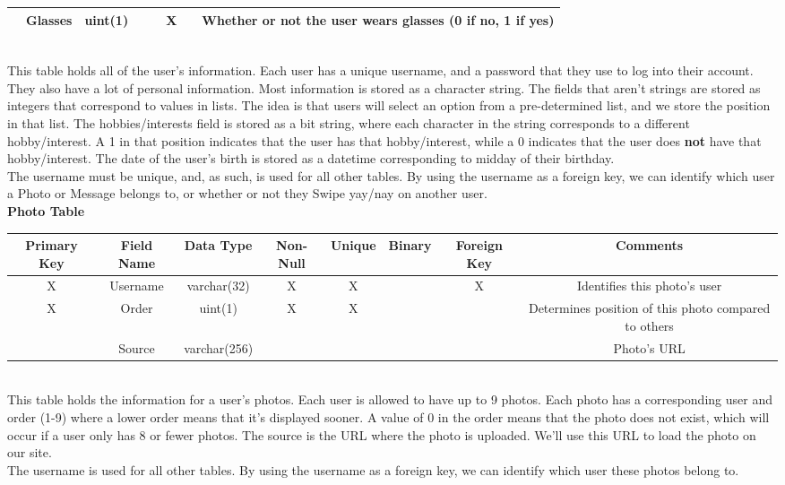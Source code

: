 \documentclass{article}
\begin{document}
\begin{enumerate}
\begin{adjustbox}{width=1.2\textwidth}
\begin{tabular}{|c|c|c|c|c|c|c|c|}
                 & Glasses & uint(1) &  &  & X &  & Whether or not the user wears glasses (0 if no, 1 if yes)\\ \hline
            \end{tabular}
        \end{adjustbox}\\
        This table holds all of the user's information. Each user has a unique username, and a password that they use to log into their account. They also have a lot of personal information. Most information is stored as a character string. The fields that aren't strings are stored as integers that correspond to values in lists. The idea is that users will select an option from a pre-determined list, and we store the position in that list. The hobbies/interests field is stored as a bit string, where each character in the string corresponds to a different hobby/interest. A 1 in that position indicates that the user has that hobby/interest, while a 0 indicates that the user does \textbf{not} have that hobby/interest. The date of the user's birth is stored as a datetime corresponding to midday of their birthday.\\
        The username must be unique, and, as such, is used for all other tables. By using the username as a foreign key, we can identify which user a Photo or Message belongs to, or whether or not they Swipe yay/nay on another user.\\
        
        \textbf{Photo Table}\\
        \begin{adjustbox}{width=1.2\textwidth}
            \begin{tabular}{|c|c|c|c|c|c|c|c|}
                \hline
                Primary Key & Field Name & Data Type & Non-Null & Unique & Binary & Foreign Key & Comments \\ \hline
                X & Username & varchar(32) & X & X &  & X & Identifies this photo's user\\ \hline
                X & Order & uint(1) & X & X &  &  & Determines position of this photo compared to others\\ \hline
                 & Source & varchar(256) &  &  &  &  & Photo's URL\\ \hline
            \end{tabular}
        \end{adjustbox}\\
        This table holds the information for a user's photos. Each user is allowed to have up to 9 photos. Each photo has a corresponding user and order (1-9) where a lower order means that it's displayed sooner. A value of 0 in the order means that the photo does not exist, which will occur if a user only has 8 or fewer photos. The source is the URL where the photo is uploaded. We'll use this URL to load the photo on our site.\\
        The username is used for all other tables. By using the username as a foreign key, we can identify which user these photos belong to.\\
        

\end{enumerate}
\end{document}

